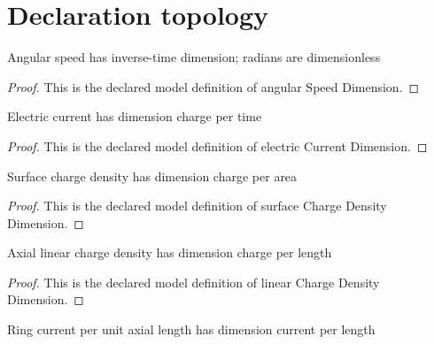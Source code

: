 \section{Declaration topology}
\begin{definition}
  \label{def:physics:phyx-mini-0969:phyxminiproblems-problemphyxmini0969-angularspeeddimension}
  Angular speed has inverse-time dimension; radians are dimensionless
\end{definition}
\begin{proof}
  This is the declared model definition of angular Speed Dimension.
\end{proof}
\begin{definition}
  \label{def:physics:phyx-mini-0969:phyxminiproblems-problemphyxmini0969-electriccurrentdimension}
  Electric current has dimension charge per time
\end{definition}
\begin{proof}
  This is the declared model definition of electric Current Dimension.
\end{proof}
\begin{definition}
  \label{def:physics:phyx-mini-0969:phyxminiproblems-problemphyxmini0969-surfacechargedensitydimension}
  Surface charge density has dimension charge per area
\end{definition}
\begin{proof}
  This is the declared model definition of surface Charge Density Dimension.
\end{proof}
\begin{definition}
  \label{def:physics:phyx-mini-0969:phyxminiproblems-problemphyxmini0969-linearchargedensitydimension}
  Axial linear charge density has dimension charge per length
\end{definition}
\begin{proof}
  This is the declared model definition of linear Charge Density Dimension.
\end{proof}
\begin{definition}
  \label{def:physics:phyx-mini-0969:phyxminiproblems-problemphyxmini0969-currentperlengthdimension}
  Ring current per unit axial length has dimension current per length
\end{definition}
